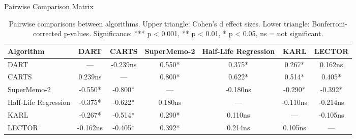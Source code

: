 \begin{table}[htbp]
\centering
\caption{Pairwise Comparison Matrix}
\begin{tabular}{lcccccc}
\toprule
Algorithm & DART & CARTS & SuperMemo-2 & Half-Life Regression & KARL & LECTOR \\
\midrule
DART & — & -0.239ns & 0.550* & 0.375* & 0.267* & 0.162ns \\
CARTS & 0.239ns & — & 0.800* & 0.622* & 0.514* & 0.405* \\
SuperMemo-2 & -0.550* & -0.800* & — & -0.180ns & -0.290* & -0.392* \\
Half-Life Regression & -0.375* & -0.622* & 0.180ns & — & -0.110ns & -0.214ns \\
KARL & -0.267* & -0.514* & 0.290* & 0.110ns & — & -0.105ns \\
LECTOR & -0.162ns & -0.405* & 0.392* & 0.214ns & 0.105ns & — \\
\bottomrule
\end{tabular}
\label{tab:pairwise-comparison-matrix}
\caption*{Pairwise comparisons between algorithms. Upper triangle: Cohen's d effect sizes. Lower triangle: Bonferroni-corrected p-values. Significance: *** p < 0.001, ** p < 0.01, * p < 0.05, ns = not significant.}
\end{table}
